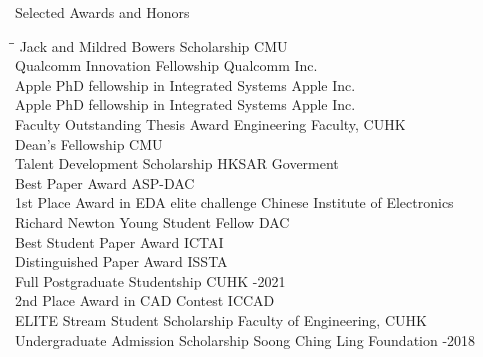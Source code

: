 
\begin{rSection}{Selected Awards and Honors}
\begin{tabbing}
\hspace{3.6in}\= \hspace{2.1in}\= \kill
Jack and Mildred Bowers Scholarship \> CMU  \\
Qualcomm Innovation Fellowship \> Qualcomm Inc.  \\
Apple PhD fellowship in Integrated Systems \> Apple Inc.  \\
Apple PhD fellowship in Integrated Systems \> Apple Inc.  \\
Faculty Outstanding Thesis Award \> Engineering Faculty, CUHK  \\
Dean's Fellowship \> CMU  \\
Talent Development Scholarship \> HKSAR Goverment  \\
Best Paper Award                       \> ASP-DAC                       \\
1st Place Award in EDA elite challenge\> Chinese Institute of Electronics  \\
Richard Newton Young Student Fellow    \> DAC  \\
Best Student Paper Award                       \> ICTAI                       \\
Distinguished Paper Award                      \>ISSTA                      \\
Full Postgraduate Studentship   \>CUHK  -2021\\
     2nd Place Award in CAD Contest               \> ICCAD                       \\
    ELITE Stream Student Scholarship                \> Faculty of Engineering, CUHK                             \\
    Undergraduate Admission Scholarship                             \> Soong Ching Ling Foundation  -2018 \\
\end{tabbing}
\end{rSection}


